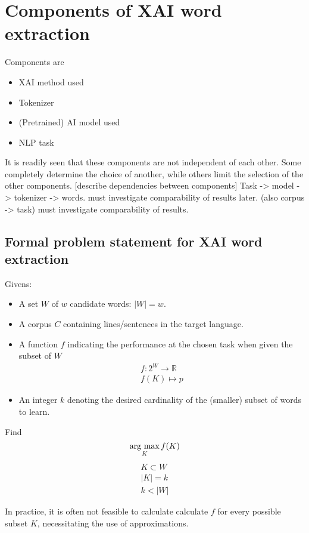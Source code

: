 \section{Components of XAI word extraction}
Components are
\begin{itemize}
	\item XAI method used
	\item Tokenizer
	\item (Pretrained) AI model used
	\item NLP task
\end{itemize}

It is readily seen that these components are not independent of each other.
Some completely determine the choice of another, while others limit the selection of the other components.
	[describe dependencies between components]
Task -> model -> tokenizer -> words.
must investigate comparability of results later.
(also corpus -> task)
must investigate comparability of results.

\subsection{Formal problem statement for XAI word extraction}

Givens:

\begin{itemize}
	\item A set $W$ of $w$ candidate words: $|W| = w$.

	\item A corpus $C$ containing lines/sentences in the target language.

	\item A function $f$ indicating the performance at the chosen task when given the subset of $W$ 
	      \begin{align*}f : 2^{W} \to \mathbb{R} \\
			  f (K) \mapsto p
		  \end{align*}

	\item An integer $k$ denoting the desired cardinality of the (smaller) subset of words to learn.
\end{itemize}
Find
\[
	\mathop{\rm arg~max}\limits_{K} f(K)
\]
\begin{align*}
	K \subset W \\
	|K| = k     \\
	k < |W|
\end{align*}

In practice, it is often not feasible to calculate calculate $f$ for every possible subset $K$, necessitating the use of approximations.




